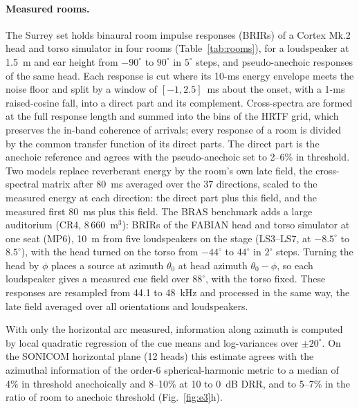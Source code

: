 \documentclass[11pt]{article}
\begin{document}
\paragraph{Measured rooms.} The Surrey set \citep{hummersone2010} holds binaural room impulse responses (BRIRs) of a Cortex Mk.2 head and torso simulator in four rooms (Table~\ref{tab:rooms}), for a loudspeaker at 1.5~m and ear height from $-90^\circ$ to $90^\circ$ in $5^\circ$ steps, and pseudo-anechoic responses of the same head. Each response is cut where its 10-ms energy envelope meets the noise floor and split by a window of $[-1,2.5]$~ms about the onset, with a 1-ms raised-cosine fall, into a direct part and its complement. Cross-spectra are formed at the full response length and summed into the bins of the HRTF grid, which preserves the in-band coherence of arrivals; every response of a room is divided by the common transfer function of its direct parts. The direct part is the anechoic reference and agrees with the pseudo-anechoic set to 2--6\% in threshold. Two models replace reverberant energy by the room's own late field, the cross-spectral matrix after 80~ms averaged over the 37 directions, scaled to the measured energy at each direction: the direct part plus this field, and the measured first 80~ms plus this field. The BRAS benchmark \citep{aspoeck2020,brinkmann2021} adds a large auditorium (CR4, 8\,660~m$^3$): BRIRs of the FABIAN head and torso simulator at one seat (MP6), 10~m from five loudspeakers on the stage (LS3--LS7, at $-8.5^\circ$ to $8.5^\circ$), with the head turned on the torso from $-44^\circ$ to $44^\circ$ in $2^\circ$ steps. Turning the head by $\phi$ places a source at azimuth $\theta_0$ at head azimuth $\theta_0-\phi$, so each loudspeaker gives a measured cue field over $88^\circ$, with the torso fixed. These responses are resampled from 44.1 to 48~kHz and processed in the same way, the late field averaged over all orientations and loudspeakers.

With only the horizontal arc measured, information along azimuth is computed by local quadratic regression of the cue means and log-variances over $\pm20^\circ$. On the SONICOM horizontal plane (12 heads) this estimate agrees with the azimuthal information of the order-6 spherical-harmonic metric to a median of 4\% in threshold anechoically and 8--10\% at 10 to 0~dB DRR, and to 5--7\% in the ratio of room to anechoic threshold (Fig.~\ref{fig:e3}h).
\end{document}
